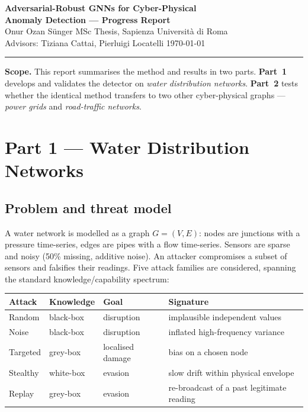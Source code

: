 \documentclass[11pt,a4paper]{article}
\begin{document}
\begin{center}
  {\Large\bfseries Adversarial-Robust GNNs for Cyber-Physical\\[2pt]
   Anomaly Detection --- Progress Report}\\[6pt]
  {\normalsize Onur Ozan S\"unger \quad\textbar\quad MSc Thesis, Sapienza
   Universit\`a di Roma}\\[2pt]
  {\small Advisors: Tiziana Cattai, Pierluigi Locatelli \quad\textbar\quad
   \today}
\end{center}

\vspace{2pt}
\hrule
\vspace{6pt}

\noindent
\textbf{Scope.} This report summarises the method and results in two
parts. \textbf{Part~1} develops and validates the detector on
\emph{water distribution networks}. \textbf{Part~2} tests whether the
identical method transfers to two other cyber-physical graphs ---
\emph{power grids} and \emph{road-traffic networks}.

\section{Part 1 --- Water Distribution Networks}

\subsection{Problem and threat model}
A water network is modelled as a graph $G=(V,E)$: nodes are junctions
with a pressure time-series, edges are pipes with a flow time-series.
Sensors are sparse and noisy (50\% missing, additive noise). An attacker
compromises a subset of sensors and falsifies their readings. Five attack
families are considered, spanning the standard knowledge/capability
spectrum:

\begin{center}\small
\begin{tabularx}{\linewidth}{@{}l l l X@{}}
\toprule
\textbf{Attack} & \textbf{Knowledge} & \textbf{Goal} & \textbf{Signature} \\
\midrule
Random    & black-box & disruption & implausible independent values \\
Noise     & black-box & disruption & inflated high-frequency variance \\
Targeted  & grey-box  & localised damage & bias on a chosen node \\
Stealthy  & white-box & evasion & slow drift within physical envelope \\
Replay    & grey-box  & evasion & re-broadcast of a past legitimate reading \\
\bottomrule
\end{tabularx}
\end{center}
\end{document}
